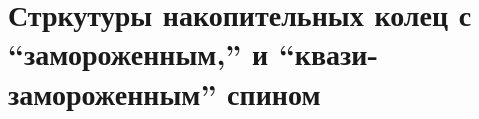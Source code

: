 \chapter{Стркутуры накопительных колец с ``замороженным,'' и ``квази-замороженным'' спином} \label{chpt:FS_and_QFS_lattices}



